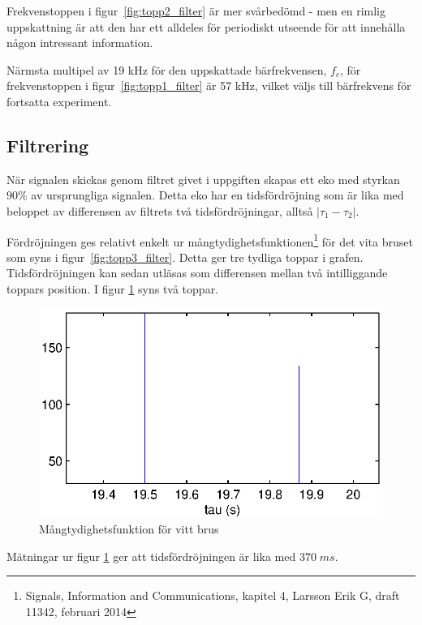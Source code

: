 \documentclass[10pt,twocolumn]{article}
\begin{document}
Frekvenstoppen i figur~\ref{fig:topp2_filter} är mer svårbedömd - men en rimlig uppskattning är att den har ett alldeles för periodiskt utseende för att innehålla någon intressant information. 

Närmsta multipel av 19 kHz för den uppskattade bärfrekvensen, $f_c$, för frekvenstoppen i figur~\ref{fig:topp1_filter} är 57 kHz, vilket väljs till bärfrekvens för fortsatta experiment. 

\subsection{Filtrering}

När signalen skickas genom filtret givet i uppgiften skapas ett eko med styrkan $90\%$ av ursprungliga signalen. Detta eko har en tidsfördröjning som är lika med beloppet av differensen av filtrets två tidsfördröjningar, alltså $|\tau_1 - \tau_2|$.

Fördröjningen ges relativt enkelt ur mångtydighetsfunktionen\footnote{Signals, Information and Communications, kapitel 4, Larsson Erik G, draft 11342, februari 2014} för det vita bruset som syns i figur~\ref{fig:topp3_filter}. Detta ger tre tydliga toppar i grafen. Tidsfördröjningen kan sedan utläsas som differensen mellan två intilliggande toppars position. I figur \ref{fig:xCorr} syns två toppar.  
\begin{figure}[htp]
  \begin{center}
  \includegraphics[keepaspectratio=true,width=\linewidth]{xCorr.eps}  %
  \end{center}
  \caption{Mångtydighetsfunktion för vitt brus} %
  \label{fig:xCorr}
\end{figure}
Mätningar ur figur \ref{fig:xCorr} ger att tidsfördröjningen är lika med $370\;ms$. 
\end{document}
